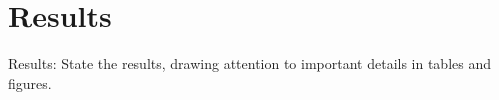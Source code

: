 
\section{Results}


Results: State the results, drawing attention to important details in tables and figures.